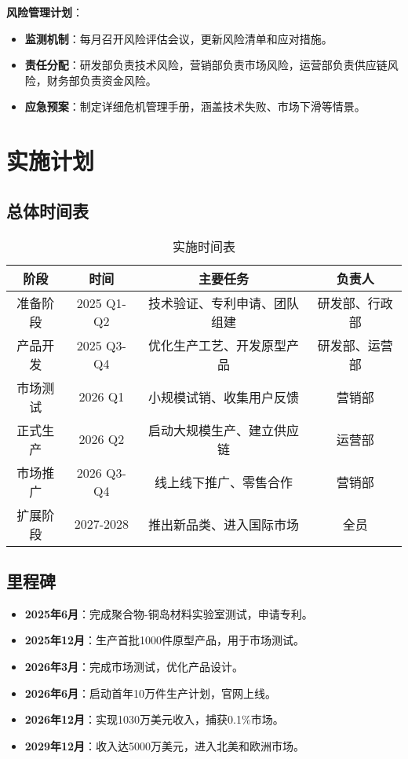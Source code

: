 \documentclass[UTF8]{report}
\theoremstyle{MyLineTheoremStyle} %
\theoremstyle{MyBlockTheoremStyle} %
\theoremstyle{MySubsubsectionStyle} %
\begin{document}
\vspace{1ex}
\textbf{风险管理计划}：
\begin{itemize}[itemsep=1ex,leftmargin=*]
  \item \textbf{监测机制}：每月召开风险评估会议，更新风险清单和应对措施。
  \item \textbf{责任分配}：研发部负责技术风险，营销部负责市场风险，运营部负责供应链风险，财务部负责资金风险。
  \item \textbf{应急预案}：制定详细危机管理手册，涵盖技术失败、市场下滑等情景。
\end{itemize}

\chapter{实施计划}
\section{总体时间表}
\begin{table}[h]
    \centering
    \begin{tabular}{|c|c|c|c|}
        \hline
        \textbf{阶段} & \textbf{时间} & \textbf{主要任务} & \textbf{负责人} \\
        \hline
        准备阶段 & 2025 Q1-Q2 & 技术验证、专利申请、团队组建 & 研发部、行政部 \\
        \hline
        产品开发 & 2025 Q3-Q4 & 优化生产工艺、开发原型产品 & 研发部、运营部 \\
        \hline
        市场测试 & 2026 Q1 & 小规模试销、收集用户反馈 & 营销部 \\
        \hline
        正式生产 & 2026 Q2 & 启动大规模生产、建立供应链 & 运营部 \\
        \hline
        市场推广 & 2026 Q3-Q4 & 线上线下推广、零售合作 & 营销部 \\
        \hline
        扩展阶段 & 2027-2028 & 推出新品类、进入国际市场 & 全员 \\
        \hline
    \end{tabular}
    \caption{实施时间表}
\end{table}

\section{里程碑}
\begin{itemize}
    \item \textbf{2025年6月}：完成聚合物-铜岛材料实验室测试，申请专利。
    \item \textbf{2025年12月}：生产首批1000件原型产品，用于市场测试。
    \item \textbf{2026年3月}：完成市场测试，优化产品设计。
    \item \textbf{2026年6月}：启动首年10万件生产计划，官网上线。
    \item \textbf{2026年12月}：实现1030万美元收入，捕获0.1\%市场。
    \item \textbf{2029年12月}：收入达5000万美元，进入北美和欧洲市场。
\end{itemize}
\end{document}
